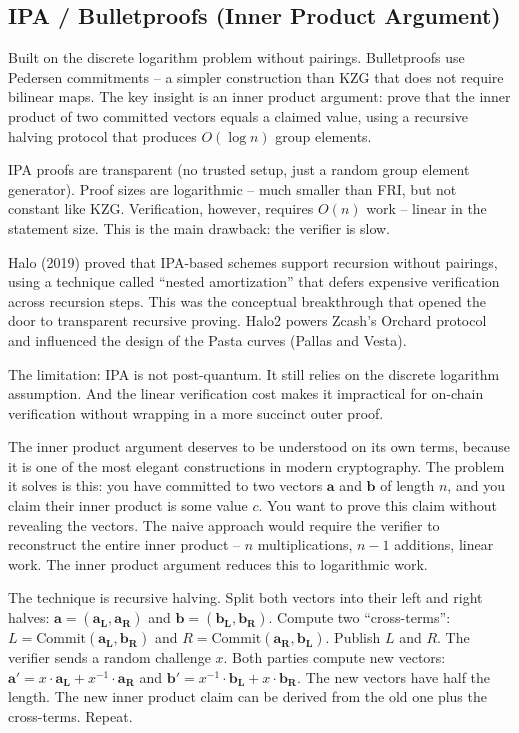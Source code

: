 \documentclass[
  11pt,
  openany]{report}
\begin{document}
\subsection{IPA / Bulletproofs (Inner Product
Argument)}\label{ipa-bulletproofs-inner-product-argument}

Built on the discrete logarithm problem without pairings. Bulletproofs use
Pedersen commitments -- a simpler construction than KZG that does not require
bilinear maps. The key insight is an inner product argument: prove that the
inner product of two committed vectors equals a claimed value, using a recursive
halving protocol that produces \(O(\log n)\) group elements.

IPA proofs are transparent (no trusted setup, just a random group element
generator). Proof sizes are logarithmic -- much smaller than FRI, but not
constant like KZG. Verification, however, requires \(O(n)\) work -- linear in
the statement size. This is the main drawback: the verifier is slow.

Halo (2019) proved that IPA-based schemes support recursion without pairings,
using a technique called ``nested amortization'' that defers expensive
verification across recursion steps. This was the conceptual breakthrough that
opened the door to transparent recursive proving. Halo2 powers Zcash's Orchard
protocol and influenced the design of the Pasta curves (Pallas and Vesta).

The limitation: IPA is not post-quantum. It still relies on the discrete
logarithm assumption. And the linear verification cost makes it impractical for
on-chain verification without wrapping in a more succinct outer proof.

The inner product argument deserves to be understood on its own terms, because
it is one of the most elegant constructions in modern cryptography. The problem
it solves is this: you have committed to two vectors \(\mathbf{a}\) and
\(\mathbf{b}\) of length \(n\), and you claim their inner product is some value
\(c\). You want to prove this claim without revealing the vectors. The naive
approach would require the verifier to reconstruct the entire inner product --
\(n\) multiplications, \(n - 1\) additions, linear work. The inner product
argument reduces this to logarithmic work.

The technique is recursive halving. Split both vectors into their left and right
halves: \(\mathbf{a} = (\mathbf{a_L}, \mathbf{a_R})\) and
\(\mathbf{b} = (\mathbf{b_L}, \mathbf{b_R})\). Compute two ``cross-terms'':
\(L = \text{Commit}(\mathbf{a_L}, \mathbf{b_R})\) and
\(R = \text{Commit}(\mathbf{a_R}, \mathbf{b_L})\). Publish \(L\) and \(R\). The
verifier sends a random challenge \(x\). Both parties compute new vectors:
\(\mathbf{a'} = x \cdot \mathbf{a_L} + x^{-1} \cdot \mathbf{a_R}\) and
\(\mathbf{b'} = x^{-1} \cdot \mathbf{b_L} + x \cdot \mathbf{b_R}\). The new
vectors have half the length. The new inner product claim can be derived from
the old one plus the cross-terms. Repeat.
\end{document}
